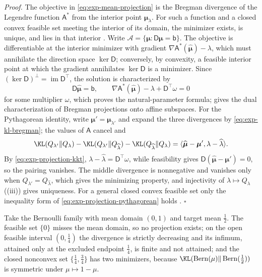 \noindent\emph{Proof.}
The objective in \eqref{eq:exp-mean-projection} is the Bregman divergence of
the Legendre function \(\mathsf A^\ast\) from the interior point
\(\boldsymbol\mu_\lambda\). For such a function and a closed convex feasible
set meeting the interior of its domain, the minimizer exists, is unique, and
lies in that interior \citep[Theorem~3.12(iii)]{BauschkeBorwein1997}. Write
\(\mathscr A=\{\boldsymbol\mu:\mathsf D\boldsymbol\mu=\mathsf b\}\). The
objective is differentiable at the interior minimizer with gradient
\(\nabla\mathsf A^\ast(\widehat{\boldsymbol\mu})-\lambda\), which must
annihilate the direction space \(\ker\mathsf D\); conversely, by convexity, a
feasible interior point at which the gradient annihilates \(\ker\mathsf D\) is
a minimizer. Since \((\ker\mathsf D)^\perp=\operatorname{im}\mathsf D^\top\),
the solution is characterized by
\begin{equation}
\mathsf D\widehat{\boldsymbol\mu}=\mathsf b,\qquad
\nabla\mathsf A^\ast(\widehat{\boldsymbol\mu})-\lambda+\mathsf D^\top\omega=0
\label{eq:exp-projection-kkt}
\end{equation}
for some multiplier \(\omega\), which proves the natural-parameter formula;
\citet{Bauschke2003} gives the dual characterization of Bregman projections
onto affine subspaces. For the Pythagorean identity, write
\(\boldsymbol\mu'=\boldsymbol\mu_{\lambda'}\) and expand the three divergences
by \eqref{eq:exp-kl-bregman}; the values of \(\mathsf A\) cancel and
\[
\KL(Q_{\lambda'}\Vert Q_\lambda)
-\KL(Q_{\lambda'}\Vert Q_{\widehat\lambda})
-\KL(Q_{\widehat\lambda}\Vert Q_\lambda)
=\langle\widehat{\boldsymbol\mu}-\boldsymbol\mu',\lambda-\widehat\lambda\rangle.
\]
By \eqref{eq:exp-projection-kkt}, \(\lambda-\widehat\lambda=\mathsf D^\top\omega\),
while feasibility gives \(\mathsf D(\widehat{\boldsymbol\mu}-\boldsymbol\mu')=0\),
so the pairing vanishes. The middle divergence is nonnegative and vanishes
only when \(Q_{\lambda'}=Q_{\widehat\lambda}\), which gives the minimizing
property, and injectivity of \(\lambda\mapsto Q_\lambda\)
((iii)) gives uniqueness. For a general
closed convex feasible set only the inequality form of
\eqref{eq:exp-projection-pythagorean} holds
\citep[Proposition~3.16]{BauschkeBorwein1997}. \(\square\)

Take the Bernoulli family with mean domain \((0,1)\) and target mean
\(\tfrac12\). The feasible set \(\{0\}\) misses the mean domain, so no
projection exists; on the open feasible interval \((0,\tfrac14)\) the
divergence is strictly decreasing and its infimum, attained only at the
excluded endpoint \(\tfrac14\), is finite and not attained; and the closed
nonconvex set \(\{\tfrac14,\tfrac34\}\) has two minimizers, because
\(\KL(\operatorname{Bern}(\mu)\Vert\operatorname{Bern}(\tfrac12))\) is
symmetric under \(\mu\mapsto1-\mu\). 

